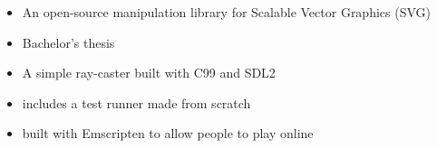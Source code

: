 \documentclass[10pt,a4paper,ragged2e,withhyper]{altacv}
\begin{document}
\begin{paracol}{2}
	\divider

	\medskip

	\begin{itemize}
		\item An open-source manipulation library for Scalable Vector Graphics (SVG)
		\item Bachelor's thesis
	\end{itemize}

	\divider

	\begin{itemize}
		\item A simple ray-caster built with C99 and SDL2
		\item includes a test runner made from scratch
		\item built with Emscripten to allow people to play online
	\end{itemize}
\end{paracol}
\end{document}
